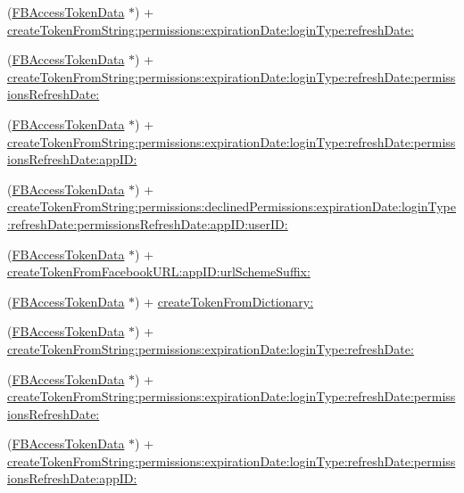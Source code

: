 \begin{DoxyCompactItemize}
(\hyperlink{interfaceFBAccessTokenData}{F\+B\+Access\+Token\+Data} $\ast$) + \hyperlink{interfaceFBAccessTokenData_af4dd1baa0412b64f5234595a50db223d}{create\+Token\+From\+String\+:permissions\+:expiration\+Date\+:login\+Type\+:refresh\+Date\+:}
\item 
(\hyperlink{interfaceFBAccessTokenData}{F\+B\+Access\+Token\+Data} $\ast$) + \hyperlink{interfaceFBAccessTokenData_ae197e866e84fdbfde1d66b936f0dcc90}{create\+Token\+From\+String\+:permissions\+:expiration\+Date\+:login\+Type\+:refresh\+Date\+:permissions\+Refresh\+Date\+:}
\item 
(\hyperlink{interfaceFBAccessTokenData}{F\+B\+Access\+Token\+Data} $\ast$) + \hyperlink{interfaceFBAccessTokenData_af4e6f1dc14436e143c86c4490c79f4c8}{create\+Token\+From\+String\+:permissions\+:expiration\+Date\+:login\+Type\+:refresh\+Date\+:permissions\+Refresh\+Date\+:app\+I\+D\+:}
\item 
(\hyperlink{interfaceFBAccessTokenData}{F\+B\+Access\+Token\+Data} $\ast$) + \hyperlink{interfaceFBAccessTokenData_a9acd1b715ed1dc4b9c8d7b339eca2ab2}{create\+Token\+From\+String\+:permissions\+:declined\+Permissions\+:expiration\+Date\+:login\+Type\+:refresh\+Date\+:permissions\+Refresh\+Date\+:app\+I\+D\+:user\+I\+D\+:}
\item 
(\hyperlink{interfaceFBAccessTokenData}{F\+B\+Access\+Token\+Data} $\ast$) + \hyperlink{interfaceFBAccessTokenData_a3c27c994504eb470de2aa02ce71ab3d5}{create\+Token\+From\+Facebook\+U\+R\+L\+:app\+I\+D\+:url\+Scheme\+Suffix\+:}
\item 
(\hyperlink{interfaceFBAccessTokenData}{F\+B\+Access\+Token\+Data} $\ast$) + \hyperlink{interfaceFBAccessTokenData_a0a756bdb60ce1b81cd4dbc61943315a9}{create\+Token\+From\+Dictionary\+:}
\item 
(\hyperlink{interfaceFBAccessTokenData}{F\+B\+Access\+Token\+Data} $\ast$) + \hyperlink{interfaceFBAccessTokenData_af4dd1baa0412b64f5234595a50db223d}{create\+Token\+From\+String\+:permissions\+:expiration\+Date\+:login\+Type\+:refresh\+Date\+:}
\item 
(\hyperlink{interfaceFBAccessTokenData}{F\+B\+Access\+Token\+Data} $\ast$) + \hyperlink{interfaceFBAccessTokenData_ae197e866e84fdbfde1d66b936f0dcc90}{create\+Token\+From\+String\+:permissions\+:expiration\+Date\+:login\+Type\+:refresh\+Date\+:permissions\+Refresh\+Date\+:}
\item 
(\hyperlink{interfaceFBAccessTokenData}{F\+B\+Access\+Token\+Data} $\ast$) + \hyperlink{interfaceFBAccessTokenData_af4e6f1dc14436e143c86c4490c79f4c8}{create\+Token\+From\+String\+:permissions\+:expiration\+Date\+:login\+Type\+:refresh\+Date\+:permissions\+Refresh\+Date\+:app\+I\+D\+:}

\end{DoxyCompactItemize}
